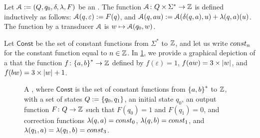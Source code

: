 \begin{definition}
    \label{transducer-sem:def}
    Let $\mathcal{A} \mathrel{:=} (Q,q_0, \delta, \lambda, F)$ be an .
    The function
    $\mathcal{A} \colon Q \times \Sigma^* \to \mathbb{Z}$
    is defined inductively as follows:
        $\mathcal{A}(q, \varepsilon) \mathrel{:=} F(q)$, and
        $\mathcal{A}(q, a u) \mathrel{:=} \mathcal{A}(\delta(q,a), u)
            + \lambda(q,a)(u)$.
    The function  by a transducer $\mathcal{A}$
    is $w \mapsto \mathcal{A}(q_0, w)$.
\end{definition}

\begin{example}
    \label{simple-transd:ex}
    Let $\mathsf{Const}$ be the set of constant functions from $\Sigma^*$ to $\mathbb{Z}$,
    and let us write $\const{n}$ for the constant function equal to $n \in \mathbb{Z}$.
    In 
    \cref{simple-transd:fig}, we provide a graphical depiction of a
     that  the function
    $f \colon \mathopen{\{} a,b \mathclose{\}}^* \to \mathbb{Z}$ defined by
    $f(\varepsilon) = 1$,
    $f(aw) = 3 \times \card{w}$,
    and $f(bw) = 3 \times \card{w} + 1$.
\end{example}

\begin{figure}
    \centering
    \caption{A , where $\mathsf{Const}$ is the set of constant functions
        from $\mathopen{\{} a,b \mathclose{\}}^*$ to $\mathbb{Z}$,
        with a set of states $Q \mathrel{:=} \mathopen{\{}  q_0, q_1  \mathclose{\}}$,
        an initial state $q_0$,
        an output function $F \colon Q \to \mathbb{Z}$ such that $F(q_0) = 1$ and $F(q_1) = 0$,
        and correction functions $\lambda(q,a) = \const{0}$, $\lambda(q,b) = \const{1}$,
        and $\lambda(q_1,a) = \lambda(q_1,b) = \const{3}$.
    }
    \label{simple-transd:fig}
\end{figure}


